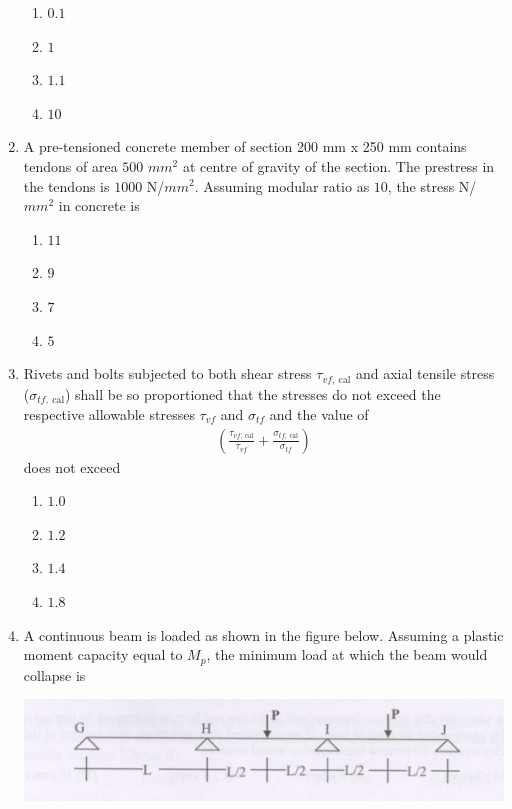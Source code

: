 \documentclass[journal]{IEEEtran}
\begin{document}
\begin{enumerate}
\begin{enumerate}
\item $0.1$
\item $1$
\item $1.1$
\item $10$
\end{enumerate}

\item A pre-tensioned concrete member of section 200 mm x 250 mm contains tendons of area $500$ $mm^{2}$
at centre of gravity of the section. The prestress in the tendons is $1000$ N/$mm^{2}$. Assuming modular
ratio as $10$, the stress N/$mm^{2}$ in concrete is \hfill {}

\begin{enumerate}
\item $11$
\item $9$
\item $7$
\item $5$
\end{enumerate}

\item Rivets and bolts subjected to both shear stress $\tau_{vf,\ \text{cal}}$ and axial tensile stress ($\sigma_{tf,\ \text{cal}}$) shall be so proportioned that the stresses do not exceed the respective allowable stresses $\tau_{vf}$ and $\sigma_{tf}$ and the value of
\begin{align}
\left( \frac{\tau_{vf,\ \text{cal}}}{\tau_{vf}} + \frac{\sigma_{tf,\ \text{cal}}}{\sigma_{tf}} \right)
\end{align}
does not exceed \hfill {}

\begin{enumerate}
\item $1.0$
\item $1.2$
\item $1.4$
\item $1.8$
\end{enumerate}

\item A continuous beam is loaded as shown in the figure below. Assuming a plastic moment capacity equal to $M_p$, the minimum load at which the beam would collapse is \hfill {}

\includegraphics[width=0.6\columnwidth]{figs/fig1.png} 
\begin{enumerate}
\end{enumerate}


\end{enumerate}
\end{document}
